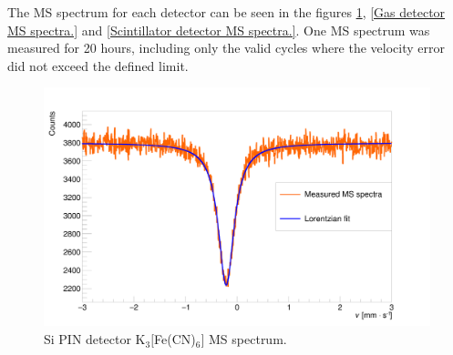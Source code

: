 \par
The MS spectrum for each detector can be seen in the figures \ref{Si PIN detector MS spectra.}, \ref{Gas detector MS spectra.} and \ref{Scintillator detector MS spectra.}. One MS spectrum was measured for 20 hours, including only the valid cycles where the velocity error did not exceed the defined limit.
%



\begin{figure}[H]
\centering
\includegraphics[scale=0.125, angle = 0]{./pictures/MossSemi.png}
\caption{Si PIN detector K$_{3}[$Fe(CN)$_{6}]$ MS spectrum.}
\label{Si PIN detector MS spectra.}

\end{figure}

